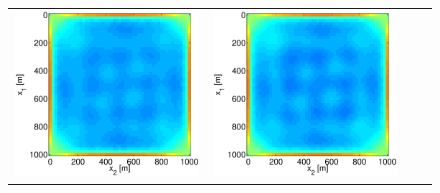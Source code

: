 \documentclass{iopart}
\begin{document}
\begin{figure}
\begin{tabular}{cccc}
\includegraphics[scale=.2]{./figs/2D_exp0_c}&
\includegraphics[scale=.2]{./figs/2D_exp0_d}\\

\end{tabular}
\end{figure}
\end{document}
